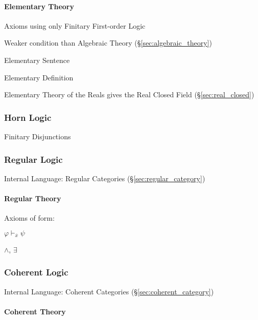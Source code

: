 \paragraph{Elementary Theory}\label{sec:elementary_theory}\hfill

Axioms using only Finitary First-order Logic %

Weaker condition than Algebraic Theory (\S\ref{sec:algebraic_theory})

Elementary Sentence

Elementary Definition

Elementary Theory of the Reals gives the Real Closed Field
(\S\ref{sec:real_closed})



\subsubsection{Horn Logic}\label{sec:horn_logic}

Finitary Disjunctions



\subsubsection{Regular Logic}\label{sec:regular_logic}

Internal Language: Regular Categories (\S\ref{sec:regular_category})



\paragraph{Regular Theory}\label{sec:regular_theory}\hfill

Axioms of form:

$\varphi \vdash_{\overline{x}} \psi$

$\wedge$, $\exists$



\subsubsection{Coherent Logic}\label{sec:coherent_logic}

Internal Language: Coherent Categories (\S\ref{sec:coherent_category})



\paragraph{Coherent Theory}\label{sec:coherent_theory}\hfill

